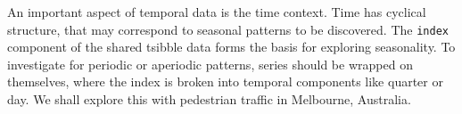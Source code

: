 An important aspect of temporal data is the time context. Time has
cyclical structure, that may correspond to seasonal patterns to be
discovered. The \texttt{index} component of the shared tsibble data
forms the basis for exploring seasonality. To investigate for periodic
or aperiodic patterns, series should be wrapped on themselves, where the
index is broken into temporal components like quarter or day. We shall
explore this with pedestrian traffic in Melbourne, Australia.

\begin{Schunk}
\begin{figure}

{\centering {}\newline{}\newline{}

}
\end{figure}
\end{Schunk}
